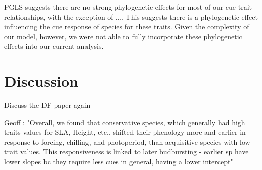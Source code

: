 \documentclass{article}\usepackage[]{graphicx}\usepackage[]{color}
\begin{document}
PGLS suggests there are no strong phylogenetic effects for most of our cue trait relationships, with the exception of .... This suggests there is a phylogenetic effect influencing the cue response of species for these traits. Given the complexity of our model, however, we were not able to fully incorporate these phylogenetic effects into our current analysis. 

\section{Discussion}

Discuss the DF paper again 

Geoff : "Overall, we found that conservative species, which generally had high traits values for SLA, Height, etc., shifted their phenology more and earlier in response to forcing, chilling, and photoperiod, than acquisitive species with low trait values. This responsiveness is linked to later budbursting - earlier sp have lower slopes bc they require less cues in general, having a lower intercept"
\end{document}
